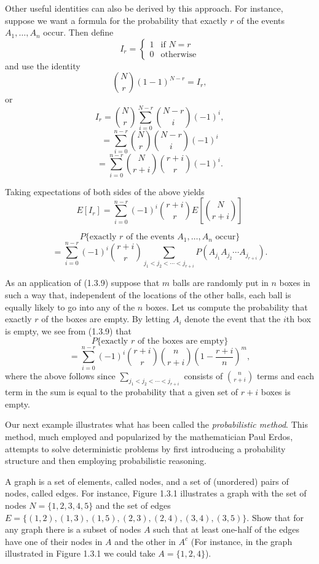\documentclass[lang=cn,10pt]{elegantbook}
\begin{document}
Other useful identities can also be derived by this approach. For instance, suppose we want a formula for the probability that exactly \(r\) of the events \(A_1, \ldots, A_n\) occur. Then define
\[
I_r = \begin{cases}
1 & \text{if } N = r \\
0 & \text{otherwise}
\end{cases}
\]
and use the identity
\[
\binom{N}{r} (1 - 1)^{N - r} = I_r,
\]
or
\[
I_r = \binom{N}{r} \sum_{i=0}^{N - r} \binom{N - r}{i} (-1)^i,
\]
\[
= \sum_{i=0}^{n - r} \binom{N}{r} \binom{N - r}{i} (-1)^i
\]
\[
= \sum_{i=0}^{n - r} \binom{N}{r + i} \binom{r + i}{r} (-1)^i.
\]

Taking expectations of both sides of the above yields
\[
E[I_r] = \sum_{i=0}^{n - r} (-1)^i \binom{r + i}{r} E\left[\binom{N}{r + i}\right]
\]

\begin{equation}
P\{\text{exactly } r \text{ of the events } A_1, \ldots, A_n \text{ occur}\}
\end{equation}
\[
= \sum_{i=0}^{n - r} (-1)^i \binom{r + i}{r} \sum_{j_1 < j_2 < \cdots < j_{r + i}} P(A_{j_1} A_{j_2} \cdots A_{j_{r + i}}).
\]

As an application of (1.3.9) suppose that \(m\) balls are randomly put in \(n\) boxes in such a way that, independent of the locations of the other balls, each ball is equally likely to go into any of the \(n\) boxes. Let us compute the probability that exactly \(r\) of the boxes are empty. By letting \(A_i\) denote the event that the \(i\)th box is empty, we see from (1.3.9) that
\[
P\{\text{exactly } r \text{ of the boxes are empty}\}
\]
\[
= \sum_{i=0}^{n - r} (-1)^i \binom{r + i}{r} \binom{n}{r + i} \left(1 - \frac{r + i}{n}\right)^m,
\]
where the above follows since \(\sum_{j_1 < j_2 < \cdots < j_{r + i}}\) consists of \(\binom{n}{r + i}\) terms and each term in the sum is equal to the probability that a given set of \(r + i\) boxes is empty.

Our next example illustrates what has been called the \textit{probabilistic method}. This method, much employed and popularized by the mathematician Paul Erdos, attempts to solve deterministic problems by first introducing a probability structure and then employing probabilistic reasoning.

\begin{example}
	A graph is a set of elements, called nodes, and a set of (unordered) pairs of nodes, called edges. For instance, Figure 1.3.1 illustrates a graph with the set of nodes \( N = \{1, 2, 3, 4, 5\} \) and the set of edges
	 \( E = \{(1, 2), (1, 3), (1, 5), (2, 3), (2, 4), (3, 4), (3, 5)\} \). Show that for any graph there is a subset of nodes \( A \) such that at least one-half of the edges have one of their nodes in \( A \) and the other in \( A^c \) (For instance, in the graph illustrated in Figure 1.3.1 we could take \( A = \{1, 2, 4\} \)).
\end{example}
\end{document}
